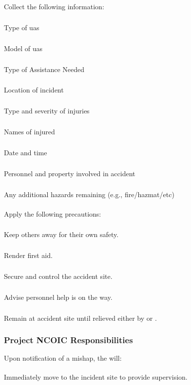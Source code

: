             \paragraph{}Collect the following information:
        
                \subparagraph{}Type of \ac{uas}
        
                \subparagraph{}Model of \ac{uas}
        
                \subparagraph{}Type of Assistance Needed
        
                \subparagraph{}Location of incident
        
                \subparagraph{}Type and severity of injuries
        
                \subparagraph{}Names of injured
        
                \subparagraph{}Date and time
        
                \subparagraph{}Personnel and property involved in accident
        
                \subparagraph{}Any additional hazards remaining (e.g., fire/hazmat/etc)
        
            \paragraph{}Apply the following precautions:
        
                \subparagraph{}Keep others away for their own safety.
        
                \subparagraph{}Render first aid.
        
                \subparagraph{}Secure and control the accident site.
        
                \subparagraph{}Advise personnel help is on the way. 
        
                \subparagraph{}Remain at accident site until relieved either by  or .
        
        \subsubsection{Project NCOIC Responsibilities} Upon notification of a mishap, the  will:
        
            \paragraph{}Immediately move to the incident site to provide supervision.
        
